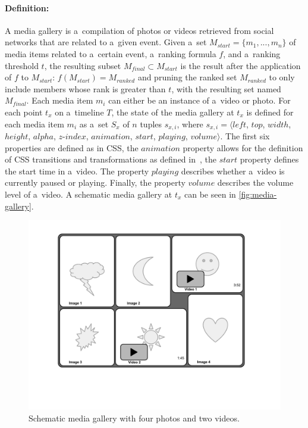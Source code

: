 \paragraph{Definition:}

A media gallery is a~compilation of photos or videos
retrieved from social networks that are related to a~given event.
Given a~set $M_{start} = \{m_1,..., m_n\}$ of media items related to a~certain event,
a~ranking formula $f$, and a~ranking threshold $t$,
the resulting subset $M_{final} \subset M_{start}$
is the result after the application of $f$ to $M_{start}$: $f(M_{start})=M_{ranked}$
and pruning the ranked set $M_{ranked}$ to only include members
whose rank is greater than $t$, with the resulting set named $M_{final}$.
Each media item $m_i$ can either be an instance of a~video or photo.
For each point $t_x$ on a~timeline $T$, the state of the media gallery
at $t_x$ is defined for each media item $m_i$
as a~set $S_x$ of $n$ tuples $s_{x,i}$, where
$s_{x,i}=\langle \mathit{left}$, $\mathit{top}$, $\mathit{width}$, $\mathit{height}$,
$\mathit{alpha}$, $\mathit{z\mbox{-}index}$, $\mathit{animation}$,
$\mathit{start}$, $\mathit{playing}$, $\mathit{volume} \rangle$.
The first six properties are defined as in CSS, the $\mathit{animation}$ property
allows for the definition of CSS transitions
and transformations as defined in~\cite{CSSTransitions2009,CSSTransforms2012},
the $\mathit{start}$ property defines the start time in a~video.
The property $\mathit{playing}$ describes whether a~video is currently paused or playing.
Finally, the property $\mathit{volume}$ describes the volume level
of a~video.
A schematic media gallery at $t_x$ can be seen in \autoref{fig:media-gallery}.

\begin{figure}[htb]
  \centering
  \includegraphics[trim=20mm 40mm 20mm 10mm, clip, width=0.7\columnwidth]{media-gallery.pdf}
  \caption{Schematic media gallery with four photos and two videos.}
  \label{fig:media-gallery}
\end{figure}

